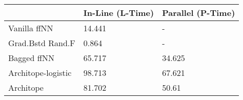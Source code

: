 \begin{tabular}{lll}
\toprule
{} & In-Line (L-Time) & Parallel (P-Time) \\
\midrule
Vanilla ffNN       &           14.441 &                 - \\
Grad.Bstd Rand.F   &            0.864 &                 - \\
Bagged ffNN        &           65.717 &            34.625 \\
Architope-logistic &           98.713 &            67.621 \\
Architope          &           81.702 &             50.61 \\
\bottomrule
\end{tabular}
